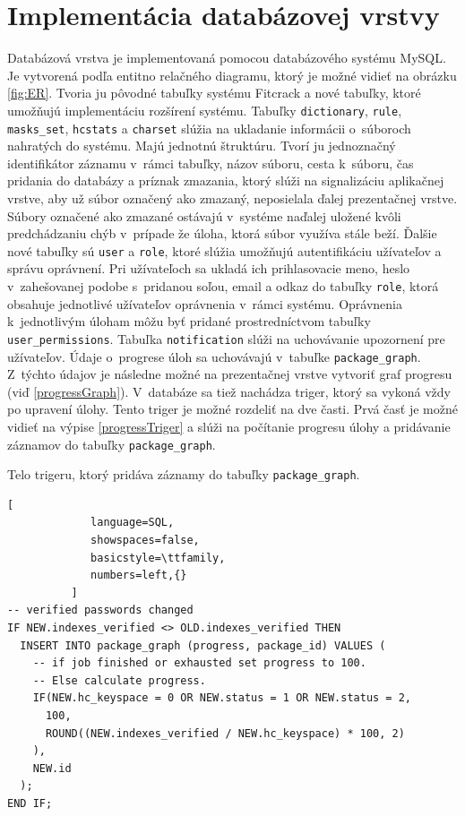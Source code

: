 \documentclass[slovak]{fitthesis}
\begin{document}
\section{Implementácia databázovej vrstvy}
Databázová vrstva je implementovaná pomocou databázového systému MySQL. Je vytvorená podľa entitno relačného diagramu, ktorý je možné vidieť na obrázku \ref{fig:ER}. Tvoria ju pôvodné tabuľky systému Fitcrack a nové tabuľky, ktoré umožňujú implementáciu rozšírení systému. Tabuľky \texttt{dictionary}, \texttt{rule}, \texttt{masks\_set}, \texttt{hcstats} a \texttt{charset} slúžia na ukladanie informácii o~súboroch nahratých do systému. Majú jednotnú štruktúru. Tvorí ju jednoznačný identifikátor záznamu v~rámci tabuľky, názov súboru, cesta k~súboru, čas pridania do databázy a príznak zmazania, ktorý slúži na signalizáciu aplikačnej vrstve, aby už súbor označený ako zmazaný, neposielala ďalej prezentačnej vrstve. Súbory označené ako zmazané ostávajú v~systéme naďalej uložené kvôli predchádzaniu chýb v~prípade že úloha, ktorá súbor využíva stále beží. Ďalšie nové tabuľky sú \texttt{user} a \texttt{role}, ktoré slúžia umožňujú autentifikáciu užívateľov a správu oprávnení. Pri užívateľoch sa ukladá ich prihlasovacie meno, heslo v~zahešovanej podobe s~pridanou soľou, email a odkaz do tabuľky \texttt{role}, ktorá obsahuje jednotlivé užívateľov oprávnenia v~rámci systému. Oprávnenia k~jednotlivým úloham môžu byť pridané prostredníctvom tabuľky \texttt{user\_permissions}. Tabuľka \texttt{notification} slúži na uchovávanie upozornení pre užívateľov. Údaje o~progrese úloh sa uchovávajú v~tabuľke \texttt{package\_graph}. Z~týchto údajov je následne možné na prezentačnej vrstve vytvoriť graf progresu (viď \ref{progressGraph}). V~databáze sa tiež nachádza triger, ktorý sa vykoná vždy po upravení úlohy. Tento triger je možné rozdeliť na dve časti. Prvá časť je možné vidieť na výpise \ref{progressTriger} a slúži na počítanie progresu úlohy a pridávanie záznamov do tabuľky \texttt{package\_graph}.
\begin{algorithm}
  \caption{Telo trigeru, ktorý pridáva záznamy do tabuľky \texttt{package\_graph}.}
  \label{progressTriger}
  \begin{lstlisting}[
             language=SQL,
             showspaces=false,
             basicstyle=\ttfamily,
             numbers=left,{}
          ]
-- verified passwords changed
IF NEW.indexes_verified <> OLD.indexes_verified THEN
  INSERT INTO package_graph (progress, package_id) VALUES (
    -- if job finished or exhausted set progress to 100. 
    -- Else calculate progress.
    IF(NEW.hc_keyspace = 0 OR NEW.status = 1 OR NEW.status = 2,
      100,
      ROUND((NEW.indexes_verified / NEW.hc_keyspace) * 100, 2)
    ),
    NEW.id  
  );
END IF;
  \end{lstlisting}
\end{algorithm}
\end{document}
